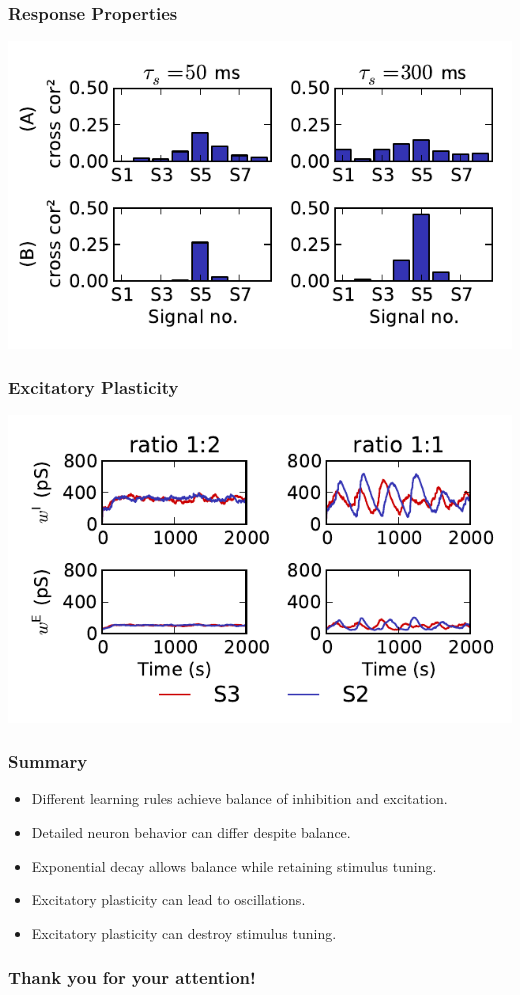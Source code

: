 \documentclass{beamer}
\begin{document}
\begin{frame} \frametitle{Response Properties}
    \begin{center}
        \includegraphics[width=\textwidth]{figures/correlations}
    \end{center}
\end{frame}

\begin{frame} \frametitle{Excitatory Plasticity}
    \begin{center}
        \includegraphics[width=\textwidth]{figures/exc-stdp-mult-l2}
    \end{center}
\end{frame}

\begin{frame} \frametitle{Summary}
    \begin{itemize}
        \item Different learning rules achieve balance of inhibition and 
            excitation.
        \item Detailed neuron behavior can differ despite balance.
        \item Exponential decay allows balance while retaining stimulus tuning.
        \item Excitatory plasticity can lead to oscillations.
        \item Excitatory plasticity can destroy stimulus tuning.
    \end{itemize}
\end{frame}

\begin{frame} \frametitle{Thank you for your attention!}
    \printbibliography
\end{frame}
\end{document}
